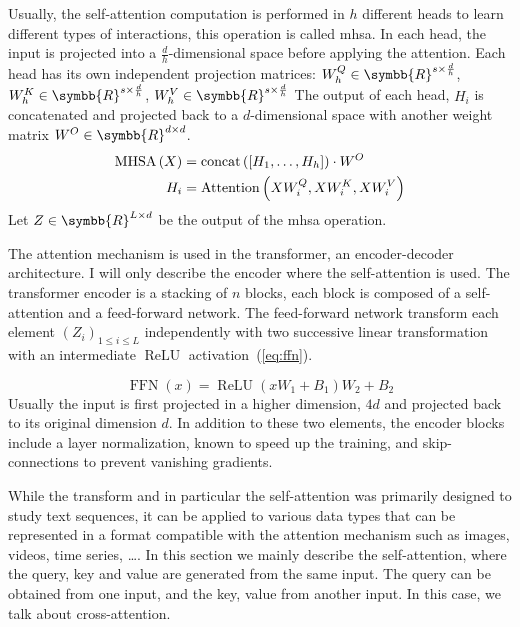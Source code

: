 \documentclass[../main.tex]{subfiles}
\begin{document}
     Usually, the self-attention computation is performed in \(h\) different heads to learn different types of interactions, this operation is called \gls{mhsa}.
     In each head, the input is projected into a \(\frac{d}{h}\)-dimensional space before applying the attention.
     Each head has its own independent projection matrices: \(W^Q_h \in \symbb{R}^{s \times \frac{d}{h}}\), \(W^K_h \in \symbb{R}^{s \times \frac{d}{h}}\), \(W^V_h \in \symbb{R}^{s \times \frac{d}{h}}\)
     The output of each head, \(H_i\) is concatenated and projected back to a \(d\)-dimensional space with another weight matrix \(W^O \in \symbb{R}^{d \times d}\).
     \begin{align}
         \operatorname{MHSA}\left(X\right) & = \operatorname{concat}\left(\left[H_1, \ldots, H_h \right] \right)\cdot W^O \\
         H_i                 & = \operatorname{Attention}\left(XW^Q_i, XW^K_i, XW^V_i\right)
     \end{align}
     Let \(Z \in \symbb{R}^{L \times d}\) be the output of the \gls{mhsa} operation.

     The attention mechanism is used in the transformer, an encoder-decoder architecture.
     I will only describe the encoder where the self-attention is used.
     The transformer encoder is a stacking of \(n\) blocks, each block is composed of a self-attention and a feed-forward network.
     The feed-forward network transform each element \({\left(Z_i\right)}_{1 \leq i \leq L}\) independently with two successive linear transformation with an intermediate \(\operatorname{ReLU}\) activation~(\cref{eq:ffn}).

     \begin{equation}
         \operatorname{FFN}\left(x\right) = \operatorname{ReLU}\left(xW_1 + B_1\right)W_2 + B_2 \label{eq:ffn}
     \end{equation}
     Usually the input is first projected in a higher dimension, \(4d\) and projected back to its original dimension \(d\).
     In addition to these two elements, the encoder blocks include a layer normalization, known to speed up the training, and skip-connections to prevent vanishing gradients.

     While the transform and in particular the self-attention was primarily designed to study text sequences, it can be applied to various data types that can be represented in a format compatible with the attention mechanism such as images, videos, time series, \dots.
     In this section we mainly describe the self-attention, where the query, key and value are generated from the same input.
     The query can be obtained from one input, and the key, value from another input.
     In this case, we talk about cross-attention.
\end{document}
